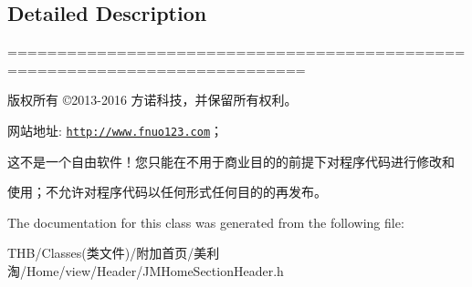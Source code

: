 \subsection{Detailed Description}
============================================================================

版权所有 ©2013-\/2016 方诺科技，并保留所有权利。

网站地址\+: \href{http://www.fnuo123.com}{\tt http\+://www.\+fnuo123.\+com}； 



这不是一个自由软件！您只能在不用于商业目的的前提下对程序代码进行修改和

使用；不允许对程序代码以任何形式任何目的的再发布。 

 

The documentation for this class was generated from the following file\+:\begin{DoxyCompactItemize}
\item 
T\+H\+B/\+Classes(类文件)/附加首页/美利淘/\+Home/view/\+Header/J\+M\+Home\+Section\+Header.\+h\end{DoxyCompactItemize}
